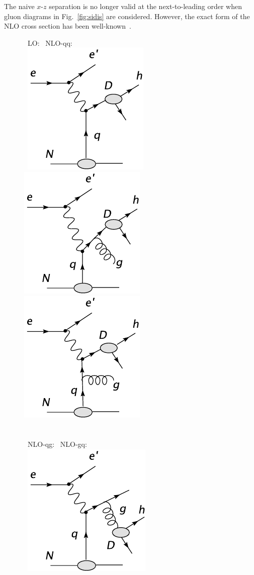The naive $x$-$z$ separation is no longer valid at the next-to-leading order
when gluon diagrams in Fig.~\ref{fig:sidis} are considered. However, the exact form of 
the NLO cross section has been well-known~\cite{graudenz}. 
\begin{figure}[htbp] 
~\hspace{0.25cm}LO:~\hspace{5.25cm} NLO-qq: \\
\vspace{-0.5cm} 
~\hspace{0.0cm}\includegraphics[width=0.24\linewidth]{figs_xj/lo1.pdf}
\hspace{2.0cm} \includegraphics[width=0.24\linewidth]{figs_xj/nlo_qq1.pdf}
~~\includegraphics[width=0.25\linewidth]{figs_xj/nlo_qq2.pdf} \\
~ \\
~ \\
~\hspace{0.25cm}NLO-qg:~ \hspace{5.75cm} NLO-gq: \\
~\hspace{0.0cm}\includegraphics[width=0.24\linewidth]{figs_xj/nlo_qg1.pdf}

\end{figure}
